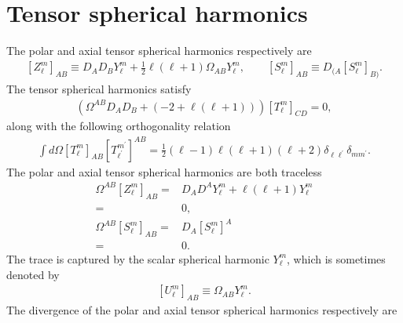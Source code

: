 \documentclass[12pt]{report}
\begin{document}
\section{Tensor spherical harmonics}
The polar and axial tensor spherical harmonics respectively are
\begin{align}
    \left[Z^m_{\ell}\right]_{AB}
    \equiv
    D_AD_BY^m_{\ell}
    +
    \frac{1}{2}\ell\left(\ell+1\right)
    \Omega_{AB}Y^m_{\ell}
    ,\qquad
    \left[S^m_{\ell}\right]_{AB}
    \equiv
    D_{(A}\left[S^m_{\ell}\right]_{B)}
    .
\end{align}
The tensor spherical harmonics satisfy
\begin{align}
    \left(
        \Omega^{AB}D_AD_B
        +
        \left(-2+\ell\left(\ell+1\right)\right)
    \right)
    \left[T^m_{\ell}\right]_{CD}
    =
    0
    ,
\end{align}
along with the following orthogonality relation
\begin{align}
    \int d\Omega 
        \left[T^m_{\ell}\right]_{AB}
        \left[T^{m^{\prime}}_{\ell^{\prime}}\right]^{AB}
    =
    \frac{1}{2}
    \left(\ell-1\right)\ell\left(\ell+1\right)\left(\ell+2\right)
    \delta_{\ell\ell^{\prime}}\delta_{mm^{\prime}}
    .
\end{align}
The polar and axial tensor spherical harmonics are both traceless
\begin{align}
    \Omega^{AB}\left[Z^m_{\ell}\right]_{AB}
    =&
    D_AD^AY^m_{\ell}
    +
    \ell\left(\ell+1\right)Y^m_{\ell}
    \nonumber\\
    =&
    0
    ,\\
    \Omega^{AB}\left[S^m_{\ell}\right]_{AB}
    =&
    D_A\left[S^m_{\ell}\right]^A
    \nonumber\\
    =&
    0
    .
\end{align}
The trace is captured by the scalar spherical harmonic $Y^m_{\ell}$,
which is sometimes denoted by \cite{Martel:2003ab}
\begin{align}
    \left[U^m_{\ell}\right]_{AB}
    \equiv
    \Omega_{AB} Y^m_{\ell}
    .
\end{align}
The divergence of the polar and axial tensor spherical harmonics
respectively are
\end{document}
